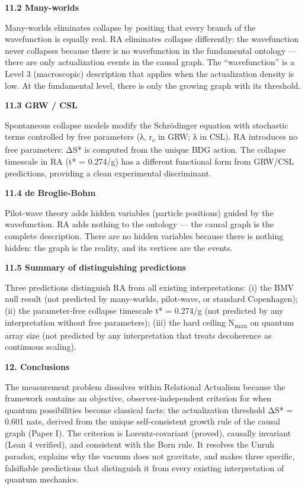 \documentclass[12pt,a4paper]{article}
\begin{document}
\textbf{11.2 Many-worlds}

Many-worlds eliminates collapse by positing that every branch of the
wavefunction is equally real. RA eliminates collapse differently: the
wavefunction never collapses because there is no wavefunction in the
fundamental ontology --- there are only actualization events in the
causal graph. The ``wavefunction'' is a Level 3 (macroscopic)
description that applies when the actualization density is low. At the
fundamental level, there is only the growing graph with its threshold.

\textbf{11.3 GRW / CSL}

Spontaneous collapse models modify the Schrödinger equation with
stochastic terms controlled by free parameters (λ, r\textsubscript{c} in
GRW; λ in CSL). RA introduces no free parameters: ΔS* is computed from
the unique BDG action. The collapse timescale in RA (t* = 0.274/g) has a
different functional form from GRW/CSL predictions, providing a clean
experimental discriminant.

\textbf{11.4 de Broglie-Bohm}

Pilot-wave theory adds hidden variables (particle positions) guided by
the wavefunction. RA adds nothing to the ontology --- the causal graph
is the complete description. There are no hidden variables because there
is nothing hidden: the graph is the reality, and its vertices are the
events.

\textbf{11.5 Summary of distinguishing predictions}

Three predictions distinguish RA from all existing interpretations: (i)
the BMV null result (not predicted by many-worlds, pilot-wave, or
standard Copenhagen); (ii) the parameter-free collapse timescale t* =
0.274/g (not predicted by any interpretation without free parameters);
(iii) the hard ceiling N\textsubscript{max} on quantum array size (not
predicted by any interpretation that treats decoherence as continuous
scaling).

\textbf{12. Conclusions}

The measurement problem dissolves within Relational Actualism because
the framework contains an objective, observer-independent criterion for
when quantum possibilities become classical facts: the actualization
threshold ΔS* = 0.601 nats, derived from the unique self-consistent
growth rule of the causal graph (Paper I). The criterion is
Lorentz-covariant (proved), causally invariant (Lean 4 verified), and
consistent with the Born rule. It resolves the Unruh paradox, explains
why the vacuum does not gravitate, and makes three specific, falsifiable
predictions that distinguish it from every existing interpretation of
quantum mechanics.
\end{document}
